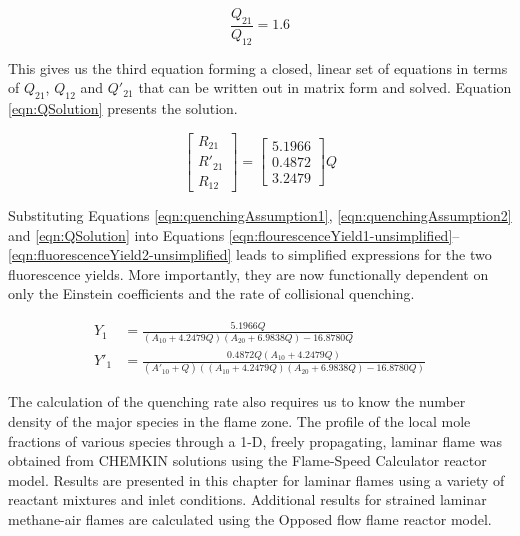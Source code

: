 \begin{equation}
  \frac{Q_{21}}{Q_{12}} = 1.6
  \label{eqn:QEquation3}
\end{equation}

This gives us the third equation forming a closed, linear set of equations in terms of \(Q_{21}\), \(Q_{12}\) and \(Q'_{21}\) that can be written out in matrix form and solved.
Equation \ref{eqn:QSolution} presents the solution.

\begin{equation}
  \left[
    \begin{matrix}
      R_{21}\\
      R'_{21}\\
      R_{12}
    \end{matrix}
  \right] = \left[
   \begin{matrix}
      5.1966\\
      0.4872\\
      3.2479
    \end{matrix}
  \right] Q
  \label{eqn:QSolution}
\end{equation}

Substituting Equations \ref{eqn:quenchingAssumption1}, \ref{eqn:quenchingAssumption2} and \ref{eqn:QSolution} into Equations \ref{eqn:flourescenceYield1-unsimplified}--\ref{eqn:fluorescenceYield2-unsimplified} leads to simplified expressions for the two fluorescence yields.
More importantly, they are now functionally dependent on only the Einstein coefficients and the rate of collisional quenching.

\begin{align}
  Y_1 &= \frac{ 5.1966Q }{ ( A_{10} + 4.2479Q )( A_{20} + 6.9838Q ) - 16.8780Q }
  \label{eqn:fluorescenceYield1}\\
  Y'_1 &= \frac{ 0.4872Q( A_{10} + 4.2479Q ) }{ ( A'_{10} + Q ) \left( ( A_{10} + 4.2479Q )( A_{20} + 6.9838Q ) - 16.8780Q \right) }
  \label{eqn:fluorescenceYield2}
\end{align}



The calculation of the quenching rate also requires us to know the number density of the major species in the flame zone.
The profile of the local mole fractions of various species through a 1-D, freely propagating, laminar flame was obtained from CHEMKIN solutions using the Flame-Speed Calculator reactor model.
Results are presented in this chapter for laminar flames using a variety of reactant mixtures and inlet conditions.
Additional results for strained laminar methane-air flames are calculated using the Opposed flow flame reactor model.

